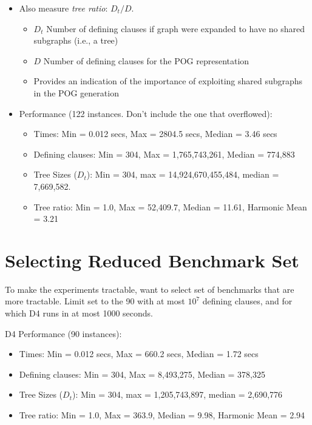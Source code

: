 \documentclass[twoside,11pt]{article}
\begin{document}
\begin{enumerate}
\begin{itemize}
     \item Also measure \emph{tree ratio}: $D_t / D$.
       \begin{itemize}
       \item $D_t$ Number of defining clauses if graph were expanded to have no shared subgraphs (i.e., a tree)
       \item $D$ Number of defining clauses for the POG representation
       \item Provides an indication of the importance of exploiting shared subgraphs in the POG generation
       \end{itemize}

     \item Performance (122 instances.  Don't include the one that overflowed):
       \begin{itemize}
       \item Times: Min = 0.012 secs, Max = 2804.5 secs, Median = 3.46 secs
       \item Defining clauses: Min = 304, Max = 1,765,743,261, Median = 774,883
       \item Tree Sizes ($D_t$): Min = 304, max = 14,924,670,455,484, median = 7,669,582.
       \item Tree ratio: Min = 1.0, Max = 52,409.7, Median = 11.61, Harmonic Mean = 3.21
       \end{itemize}
     \end{itemize}
\end{enumerate}

\section*{Selecting Reduced Benchmark Set}
       
To make the experiments tractable, want to select set of benchmarks that are more tractable.
Limit set to the 90 with at most $10^7$ defining clauses, and for which D4 runs in at most 1000 seconds.

D4 Performance (90 instances):
       \begin{itemize}
       \item Times: Min = 0.012 secs, Max = 660.2 secs, Median = 1.72 secs
       \item Defining clauses: Min = 304, Max = 8,493,275, Median = 378,325
       \item Tree Sizes ($D_t$): Min = 304, max = 1,205,743,897, median = 2,690,776
       \item Tree ratio: Min = 1.0, Max = 363.9, Median = 9.98, Harmonic Mean = 2.94
       \end{itemize}
\end{document}
